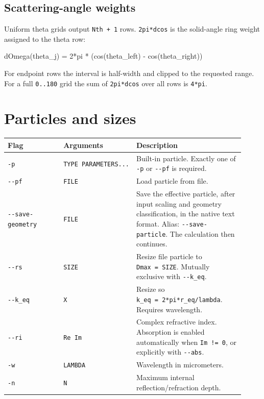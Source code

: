 \documentclass[
  10pt,
  a4paper,
]{article}
\newenvironment{Shaded}{}{}
\newcommand{\NormalTok}[1]{#1}
\begin{document}
\subsection{Scattering-angle weights}\label{scattering-angle-weights}

Uniform theta grids output \texttt{Nth\ +\ 1} rows. \texttt{2pi*dcos} is
the solid-angle ring weight assigned to the theta row:

\begin{Shaded}
\begin{Highlighting}[]
\NormalTok{dOmega(theta\_j) = 2*pi * (cos(theta\_left) {-} cos(theta\_right))}
\end{Highlighting}
\end{Shaded}

For endpoint rows the interval is half-width and clipped to the
requested range. For a full \texttt{0..180} grid the sum of
\texttt{2pi*dcos} over all rows is \texttt{4*pi}.

\section{Particles and sizes}\label{particles-and-sizes}

\begin{longtable}[]{@{}L{0.24\linewidth}L{0.22\linewidth}L{0.46\linewidth}@{}}
\toprule\noalign{}
Flag & Arguments & Description \\
\midrule\noalign{}
\endhead
\bottomrule\noalign{}
\endlastfoot
\texttt{-p} & \texttt{TYPE\ PARAMETERS...} & Built-in particle.
Exactly one of \texttt{-p} or \texttt{-\/-pf} is required. \\
\texttt{-\/-pf} & \texttt{FILE} & Load particle from file. \\
\texttt{-\/-save-geometry} & \texttt{FILE} & Save the effective particle,
after input scaling and geometry classification, in the native text format.
Alias: \texttt{-\/-save-particle}. The calculation then continues. \\
\texttt{-\/-rs} & \texttt{SIZE} & Resize file particle to
\texttt{Dmax\ =\ SIZE}. Mutually exclusive with \texttt{-\/-k\_eq}. \\
\texttt{-\/-k\_eq} & \texttt{X} & Resize so
\texttt{k\_eq\ =\ 2*pi*r\_eq/lambda}. Requires wavelength. \\
\texttt{-\/-ri} & \texttt{Re\ Im} & Complex refractive index. Absorption
is enabled automatically when \texttt{Im\ !=\ 0}, or explicitly with
\texttt{-\/-abs}. \\
\texttt{-w} & \texttt{LAMBDA} & Wavelength in micrometers. \\
\texttt{-n} & \texttt{N} & Maximum internal reflection/refraction
depth. \\
\end{longtable}
\end{document}
